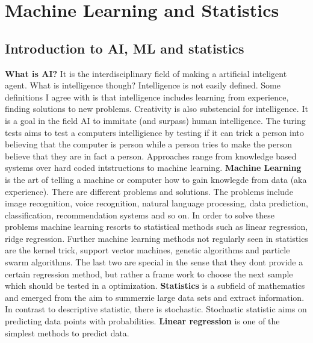 \section{Machine Learning and Statistics}

\subsection{Introduction to AI, ML and statistics}
\textbf{What is AI?} It is the interdisciplinary field of making a artificial inteligent agent. 
What is intelligence though?
Intelligence is not easily defined. Some definitions I agree with is that intelligence 
includes learning from experience, finding solutions to new problems. 
Creativity is also substencial for intelligence. 
It is a goal in the field AI to immitate (and surpass) human intelligence. 
The turing tests aims to test a computers intelligience by testing if it can trick a person into believing that the computer is person while a person tries to make the person believe that they are in fact a person. 
Approaches range from knowledge based systems over hard coded intstructions to machine learning. 
%
\textbf{Machine Learning} is the art of telling a machine or computer how to gain knowlegde from data (aka experience). 
There are different problems and solutions. 
The problems include image recognition, voice recognition, natural language processing, data prediction, classification, recommendation systems and so on. 
%
In order to solve these problems machine learning resorts to statistical methods such as
linear regression, ridge regression. 
Further machine learning methods not regularly seen in statistics are the 
kernel trick, support vector machines, genetic algorithms and particle swarm algorithms. 
The last two are special in the sense that they dont provide a certain regression method,
but rather a frame work to choose the next sample which should be tested in a optimization. 
%
\textbf{Statistics} is a subfield of mathematics and emerged from the aim to summerzie large data sets 
and extract information. In contrast to descriptive statistic, there is stochastic. 
Stochastic statistic aims on predicting data points with probabilities. 
%
\textbf{Linear regression} is one of the simplest methods to predict data. 
